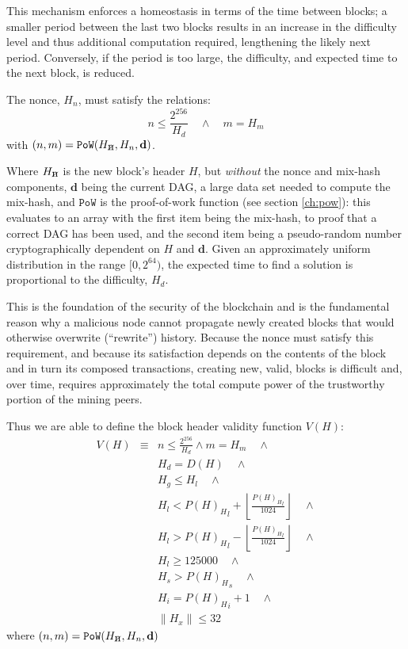 \documentclass[UTF8,nofonts]{ctexart}
\newcommand{\hcancel}[1]{%
    \tikz[baseline=(tocancel.base)]{
        \node[inner sep=0pt,outer sep=0pt] (tocancel) {#1};
        \draw[black] (tocancel.south west) -- (tocancel.north east);
    }%
}%
\begin{document}
\begin{multicols}{2}
This mechanism enforces a homeostasis in terms of the time between blocks; a smaller period between the last two blocks results in an increase in the difficulty level and thus additional computation required, lengthening the likely next period. Conversely, if the period is too large, the difficulty, and expected time to the next block, is reduced.

The nonce, $H_n$, must satisfy the relations:
\begin{equation}
n \leqslant \frac{2^{256}}{H_d} \quad \wedge \quad m = H_m
\end{equation}
with $(n, m) = \mathtt{PoW}(H_{\hcancel{n}}, H_n, \mathbf{d})$.

Where $H_{\hcancel{n}}$ is the new block's header $H$, but \textit{without} the nonce and mix-hash components, $\mathbf{d}$ being the current DAG, a large data set needed to compute the mix-hash, and $\mathtt{PoW}$ is the proof-of-work function (see section \ref{ch:pow}): this evaluates to an array with the first item being the mix-hash, to proof that a correct DAG has been used, and the second item being a pseudo-random number cryptographically dependent on $H$ and $\mathbf{d}$. Given an approximately uniform distribution in the range $[0, 2^{64})$, the expected time to find a solution is proportional to the difficulty, $H_d$.

This is the foundation of the security of the blockchain and is the fundamental reason why a malicious node cannot propagate newly created blocks that would otherwise overwrite (``rewrite'') history. Because the nonce must satisfy this requirement, and because its satisfaction depends on the contents of the block and in turn its composed transactions, creating new, valid, blocks is difficult and, over time, requires approximately the total compute power of the trustworthy portion of the mining peers.

Thus we are able to define the block header validity function $V(H)$:
\begin{eqnarray}
V(H) & \equiv &  n \leqslant \frac{2^{256}}{H_d} \wedge m = H_m \quad \wedge \\
& & H_d = D(H) \quad \wedge \\
& & H_g \le H_l  \quad \wedge \\
& & H_l < {P(H)_H}_l + \left\lfloor\frac{{P(H)_H}_l}{1024}\right\rfloor  \quad \wedge \\
& & H_l > {P(H)_H}_l - \left\lfloor\frac{{P(H)_H}_l}{1024}\right\rfloor  \quad \wedge \\
& & H_l \geqslant 125000  \quad \wedge \\
& & H_s > {P(H)_H}_s \quad \wedge \\
& & H_i = {P(H)_H}_i +1 \quad \wedge \\
& & \lVert H_x \rVert \le 32
\end{eqnarray}
where $(n, m) = \mathtt{PoW}(H_{\hcancel{n}}, H_n, \mathbf{d})$


\end{multicols}
\end{document}
